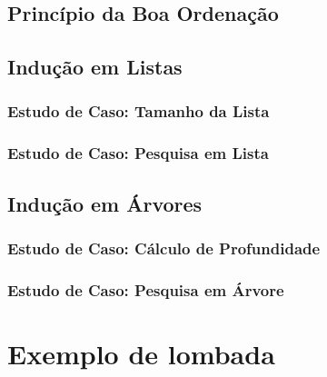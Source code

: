\documentclass[times,english,brazil,oneside]{ifes7}
\begin{document}
\section{Princípio da Boa Ordenação}

\blindtext[3]

\section{Indução em Listas}

\blindtext[2]

\subsection{Estudo de Caso: Tamanho da Lista}

\blindtext[2]

\subsection{Estudo de Caso: Pesquisa em Lista}

\blindtext[2]

\section{Indução em Árvores}

\blindtext[2]

\subsection{Estudo de Caso: Cálculo de Profundidade}

\blindtext[2]

\subsection{Estudo de Caso: Pesquisa em Árvore}

\blindtext[2]


\anexos

\partanexos*

\chapter{Exemplo de lombada}
\end{document}
